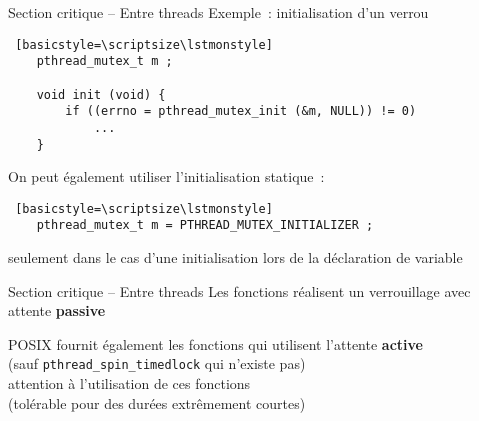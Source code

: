 \begin {frame} [fragile] {Section critique -- Entre threads}
    Exemple~: initialisation d'un verrou

    \begin {lstlisting} [basicstyle=\scriptsize\lstmonstyle]
    pthread_mutex_t m ;

    void init (void) {
        if ((errno = pthread_mutex_init (&m, NULL)) != 0)
            ...
    }
    \end{lstlisting}


    On peut également utiliser l'initialisation statique~:

    \begin {lstlisting} [basicstyle=\scriptsize\lstmonstyle]
    pthread_mutex_t m = PTHREAD_MUTEX_INITIALIZER ;
    \end{lstlisting}

    \implique seulement dans le cas d'une initialisation lors de la
    déclaration de variable

\end{frame}

\begin {frame} {Section critique -- Entre threads}
    Les fonctions  réalisent un verrouillage
    avec attente \textbf {passive}

    \vspace* {3mm}

    POSIX fournit également les fonctions  
    qui utilisent l'attente \textbf {active}
    \\
    (sauf \texttt {\small pthread\_spin\_timedlock} qui n'existe pas)
    \\
    \implique attention à l'utilisation de ces fonctions \\
    (tolérable pour des durées extrêmement courtes)

\end {frame}

